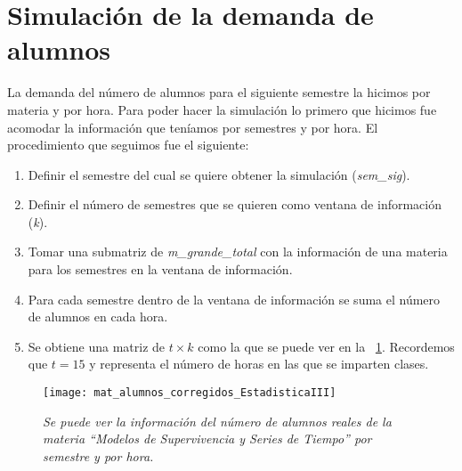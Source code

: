\section{Simulación de la demanda de alumnos} \label{SimDemandaAlumnos}

La demanda del número de alumnos para el siguiente semestre la hicimos por materia y por hora. Para poder hacer la simulación lo primero que hicimos fue acomodar la información que teníamos por semestres y por hora. El procedimiento que seguimos fue el siguiente:
  
  \begin{enumerate}
\item Definir el semestre del cual se quiere obtener la simulación (\textit{sem\_sig}).

\item Definir el número de semestres que se quieren como ventana de información (\textit{k}).

\item Tomar una submatriz de \textit{m\_grande\_total} con la información de una materia para los semestres en la ventana de información.

\item Para cada semestre dentro de la ventana de información se suma el número de alumnos en cada hora.

\item Se obtiene una matriz de $t \times k$ como la que se puede ver en la \figurename{~\ref{matAl_corregidos}}. Recordemos que $t = 15$ y representa el número de horas en las que se imparten clases.
\end{enumerate}

\begin{figure}[h]
\centering
\texttt{[image: mat\_alumnos\_corregidos\_EstadisticaIII]} %
\caption[\textit{Ejemplo de matriz con alumnos corregidos}]{\textit{Se puede ver la información del número de alumnos reales de la materia ``Modelos de Supervivencia y Series de Tiempo'' por semestre y por hora.}}\label{matAl_corregidos}
\end{figure}


